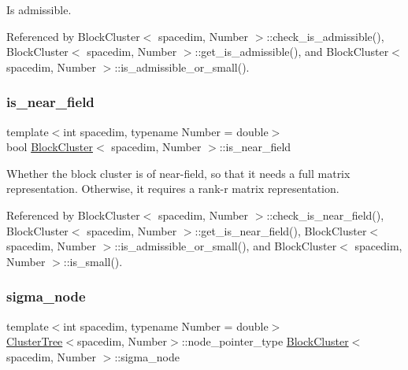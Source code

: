 Is admissible. 

Referenced by Block\+Cluster$<$ spacedim, Number $>$\+::check\+\_\+is\+\_\+admissible(), Block\+Cluster$<$ spacedim, Number $>$\+::get\+\_\+is\+\_\+admissible(), and Block\+Cluster$<$ spacedim, Number $>$\+::is\+\_\+admissible\+\_\+or\+\_\+small().

\mbox{\label{classBlockCluster_a6f719cbd6a646328f8128355c857745a}} 
\subsubsection{\texorpdfstring{is\+\_\+near\+\_\+field}{is\_near\_field}}
{\footnotesize\ttfamily template$<$int spacedim, typename Number = double$>$ \\
bool \hyperlink{classBlockCluster}{Block\+Cluster}$<$ spacedim, Number $>$\+::is\+\_\+near\+\_\+field\hspace{0.3cm}{\ttfamily [private]}}

Whether the block cluster is of near-\/field, so that it needs a full matrix representation. Otherwise, it requires a rank-\/r matrix representation. 

Referenced by Block\+Cluster$<$ spacedim, Number $>$\+::check\+\_\+is\+\_\+near\+\_\+field(), Block\+Cluster$<$ spacedim, Number $>$\+::get\+\_\+is\+\_\+near\+\_\+field(), Block\+Cluster$<$ spacedim, Number $>$\+::is\+\_\+admissible\+\_\+or\+\_\+small(), and Block\+Cluster$<$ spacedim, Number $>$\+::is\+\_\+small().

\mbox{\label{classBlockCluster_ae1005ec7feedbdb990b27d845b24bad2}} 
\subsubsection{\texorpdfstring{sigma\+\_\+node}{sigma\_node}}
{\footnotesize\ttfamily template$<$int spacedim, typename Number = double$>$ \\
\hyperlink{classClusterTree}{Cluster\+Tree}$<$spacedim, Number$>$\+::node\+\_\+pointer\+\_\+type \hyperlink{classBlockCluster}{Block\+Cluster}$<$ spacedim, Number $>$\+::sigma\+\_\+node\hspace{0.3cm}{\ttfamily [private]}}


